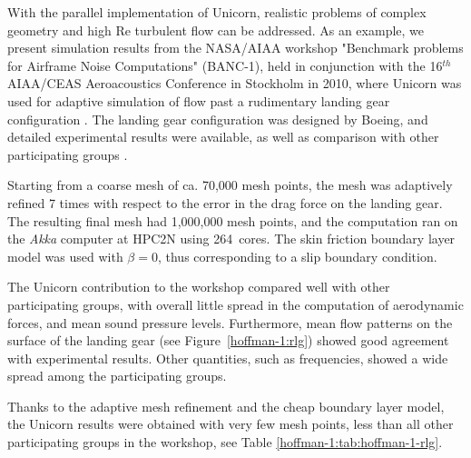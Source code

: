 With the parallel implementation of Unicorn, realistic problems of
complex geometry and high Re turbulent flow can be addressed. As an
example, we present simulation results from the NASA/AIAA workshop
"Benchmark problems for Airframe Noise Computations" (BANC-1), held in
conjunction with the 16$^{th}$ AIAA/CEAS Aeroacoustics Conference in
Stockholm in 2010, where Unicorn was used for adaptive simulation of
flow past a rudimentary landing gear configuration
\citep{VilelaJanssonEtAl2010}. The landing gear configuration was
designed by Boeing, and detailed experimental results were available,
as well as comparison with other participating groups
\citep{SpalartMejia2011}.

Starting from a coarse mesh of ca. 70,000 mesh points, the mesh was
adaptively refined 7 times with respect to the error in the drag force
on the landing gear. The resulting final mesh had 1,000,000 mesh
points, and the computation ran on the \textit{Akka} computer at HPC2N
using 264~cores. The skin friction boundary layer model was used with
$\beta=0$, thus corresponding to a slip boundary condition.

The Unicorn contribution to the workshop compared well with other
participating groups, with overall little spread in the computation
of aerodynamic forces, and mean sound pressure levels. Furthermore, mean flow
patterns on the surface of the landing gear (see Figure~\ref{hoffman-1:rlg})
showed good agreement with experimental results. Other quantities, such
as frequencies, showed a wide spread among the participating groups.

Thanks to the adaptive mesh refinement and the cheap boundary layer
model, the Unicorn results were obtained with very few mesh points,
less than all other participating groups in the workshop, see Table
\ref{hoffman-1:tab:hoffman-1-rlg}.

